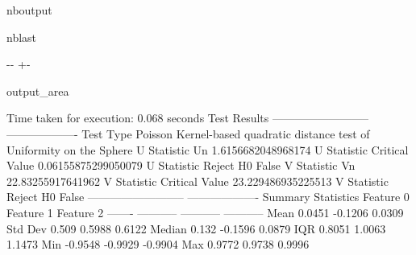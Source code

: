 \documentclass[letterpaper,10pt,english,openany,oneside]{sphinxmanual}
\begin{document}
\begin{sphinxuseclass}{nboutput}
\begin{sphinxuseclass}{nblast}
{

\kern-\sphinxverbatimsmallskipamount\kern-\baselineskip
\kern+\FrameHeightAdjust\kern-\fboxrule
\vspace{\nbsphinxcodecellspacing}

\begin{sphinxuseclass}{output_area}
\begin{sphinxuseclass}{}


\begin{sphinxVerbatim}[commandchars=\\\{\}]
Time taken for execution: 0.068 seconds
Test Results
--------------------------  -------------------
Test Type                   Poisson Kernel-based quadratic
 distance test of Uniformity on the Sphere
U Statistic Un              1.6156682048968174
U Statistic Critical Value  0.06155875299050079
U Statistic Reject H0       False
V Statistic Vn              22.83255917641962
V Statistic Critical Value  23.229486935225513
V Statistic Reject H0       False
--------------------------  -------------------
Summary Statistics
           Feature 0    Feature 1    Feature 2
-------  -----------  -----------  -----------
Mean          0.0451      -0.1206       0.0309
Std Dev       0.509        0.5988       0.6122
Median        0.132       -0.1596       0.0879
IQR           0.8051       1.0063       1.1473
Min          -0.9548      -0.9929      -0.9904
Max           0.9772       0.9738       0.9996
\end{sphinxVerbatim}



\end{sphinxuseclass}
\end{sphinxuseclass}
}

\end{sphinxuseclass}
\end{sphinxuseclass}
\end{document}
